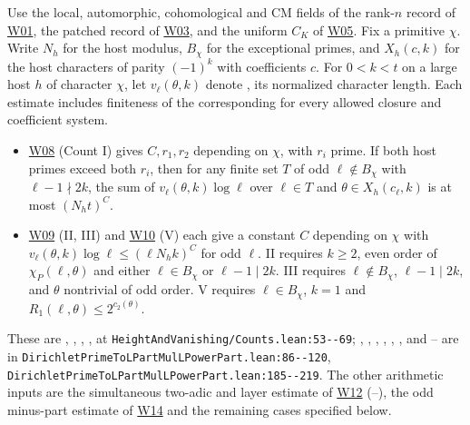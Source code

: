 \begin{formalstatement}
Use the local, automorphic, cohomological and CM fields of the rank-$n$
record of \hyperref[sub:W01]{W01}, the patched record of
\hyperref[sub:W03]{W03}, and the uniform $C_K$ of \hyperref[sub:W05]{W05}.
Fix a primitive $\chi$. Write $N_h$ for the host modulus, $B_\chi$ for the
exceptional primes, and $X_h(c,k)$ for the host characters of parity
$(-1)^k$ with coefficients $c$. For $0<k<t$ on a large host $h$ of
character $\chi$, let $v_\ell(\theta,k)$ denote , its normalized
character length. Each estimate includes finiteness of the corresponding
 for every allowed closure and coefficient system.
\begin{itemize}
\item \hyperref[sub:W08]{W08} (Count I) gives $C,r_1,r_2$ depending
on $\chi$, with $r_i$ prime. If both host primes exceed both $r_i$, then
for any finite set $T$ of odd $\ell\notin B_\chi$ with $\ell-1\nmid2k$,
the sum of $v_\ell(\theta,k)\log\ell$ over $\ell\in T$ and
$\theta\in X_h(c_\ell,k)$ is at most $(N_ht)^C$.
\item \hyperref[sub:W09]{W09} (II, III) and \hyperref[sub:W10]{W10}
(V) each give a constant $C$ depending on $\chi$ with
$v_\ell(\theta,k)\log\ell\le(\ell N_h k)^C$ for odd $\ell$.
II requires $k\ge2$, even order of $\chi_P(\ell,\theta)$ and
either $\ell\in B_\chi$ or $\ell-1\mid2k$.
III requires $\ell\notin B_\chi$, $\ell-1\mid2k$, and $\theta$
nontrivial of odd order. V requires $\ell\in B_\chi$, $k=1$ and
$R_1(\ell,\theta)\le2^{c_2(\theta)}$.
\end{itemize}
These are , , ,
,  at \nolinkurl{HeightAndVanishing/Counts.lean:53--69};
, , , , ,
,  and -- are in
\nolinkurl{DirichletPrimeToLPartMulLPowerPart.lean:86--120},
\nolinkurl{DirichletPrimeToLPartMulLPowerPart.lean:185--219}.
The other arithmetic inputs are the simultaneous two-adic and layer estimate
of \hyperref[sub:W12]{W12} (--), the odd minus-part estimate of
\hyperref[sub:W14]{W14} and the remaining cases specified below.
\end{formalstatement}


